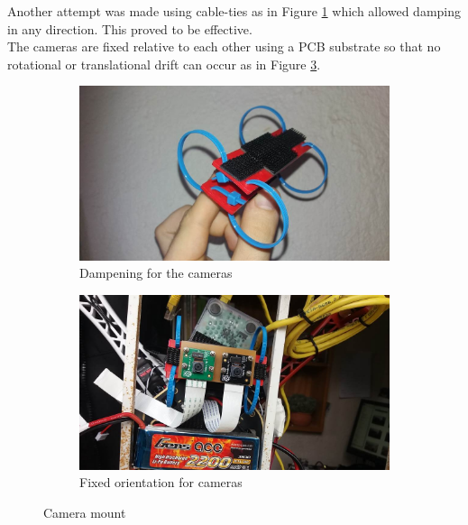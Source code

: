 Another attempt was made using cable-ties as in Figure \ref{fig:dampener} which allowed damping in any direction. This proved to be effective.\\

The cameras are fixed relative to each other using a PCB substrate so that no rotational or translational drift can occur as in Figure \ref{fig:cam_mount}.\\

\begin{figure}[H]
\begin{subfigure}{0.5\textwidth}
\centering
\includegraphics[scale=0.3]{images/dampener.jpg}
\caption{Dampening for the cameras}
\label{fig:dampener}
\end{subfigure}
\begin{subfigure}{0.5\textwidth}
\centering
\includegraphics[scale=0.3]{images/fixed_orientation.jpg}
\caption{Fixed orientation for cameras}
\label{fig:fixed_orientation}
\end{subfigure}
\caption{Camera mount}
\label{fig:cam_mount}
\end{figure}


